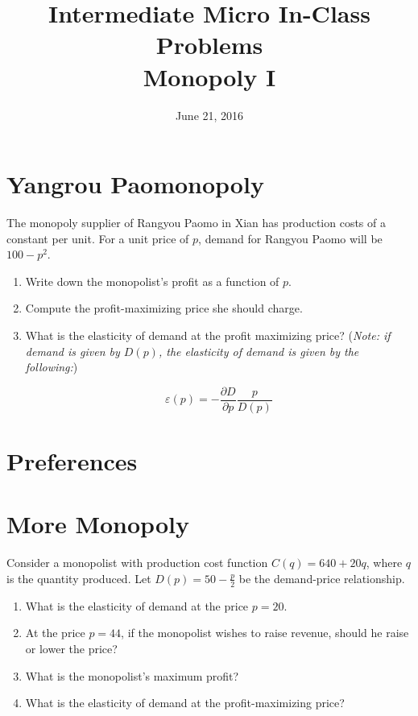 \documentclass{article}
\begin{document}
\title{Intermediate Micro In-Class Problems \\ \large Monopoly I}

\date{June 21, 2016}

\maketitle

\section*{Yangrou Paomonopoly}
The monopoly supplier of Rangyou Paomo in Xian has production costs of a constant  per unit. For a unit price of $p$, demand for Rangyou Paomo will be $100 - p^2$. 
\begin{enumerate}
\item Write down the monopolist's profit as a function of $p$.
\item Compute the profit-maximizing price she should charge.
\item What is the elasticity of demand at the profit maximizing price? (\textit{Note: if demand is given by $D(p)$, the elasticity of demand is given by the following:})

\[ \varepsilon (p) = - \frac{\partial D}{\partial p} \frac{p}{D(p)} \]

\end{enumerate}

\section{Preferences}

\section*{More Monopoly}
Consider a monopolist with production cost function $C(q) = 640 + 20q$, where $q$ is the quantity produced. Let $D(p) = 50 -
\frac{p}2$ be the demand-price relationship.

\begin{enumerate}
\item What is the elasticity of demand at the price $p = 20$.
\item At the price $p = 44$, if the monopolist wishes to raise revenue, should he raise or lower the price?
\item What is the monopolist's maximum profit?
\item What is the elasticity of demand at the profit-maximizing price?
\end{enumerate}
\end{document}
